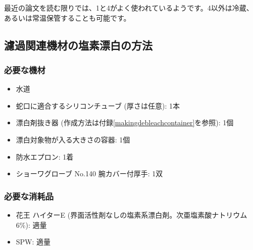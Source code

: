 \documentclass[titlepage,10pt,a4paper,uplatex]{jsbook}
\begin{document}
最近の論文を読む限りでは、1と4がよく使われているようです。4以外は冷蔵、あるいは常温保管することも可能です。

\subsection{濾過関連機材の塩素漂白の方法}

\subsubsection{必要な機材}
\begin{itemize}
\item 水道
\item 蛇口に適合するシリコンチューブ (厚さは任意): 1本
\item 漂白剤抜き器 (作成方法は付録\ref{makingdebleachcontainer}を参照): 1個
\item 漂白対象物が入る大きさの容器: 1個
\item 防水エプロン: 1着
\item ショーワグローブ No.140 腕カバー付厚手: 1双
\end{itemize}

\subsubsection{必要な消耗品}
\begin{itemize}
\item 花王 ハイターE (界面活性剤なしの塩素系漂白剤。次亜塩素酸ナトリウム6\%): 適量
\item SPW: 適量
\end{itemize}
\end{document}
